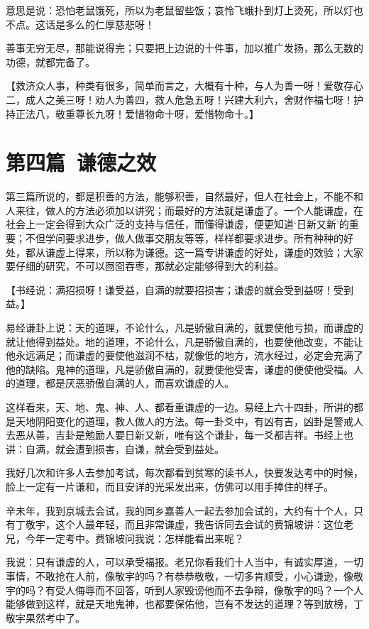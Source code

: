 \documentclass[12pt,twoside,openany]{book}
\newcommand{\kai}[1]{{\CJKfamily{kai}#1}}
\begin{document}
意思是说：恐怕老鼠饿死，所以为老鼠留些饭；哀怜飞蛾扑到灯上烫死，所以灯也不点。这话是多么的仁厚慈悲呀！

善事无穷无尽，那能说得完；只要把上边说的十件事，加以推广发扬，那么无数的功德，就都完备了。

【\kai{救济众人事，种类有很多，简单而言之，大概有十种，与人为善一呀！爱敬存心二，成人之美三呀！劝人为善四，救人危急五呀！兴建大利六，舍财作福七呀！护持正法八，敬重尊长九呀！爱惜物命十呀，爱惜物命十。}】

\chapter{第四篇\ 谦德之效}
第三篇所说的，都是积善的方法，能够积善，自然最好，但人在社会上，不能不和人来往，做人的方法必须加以讲究；而最好的方法就是谦虚了。一个人能谦虚，在社会上一定会得到大众广泛的支持与信任，而懂得谦虚，便更知道‘日新又新’的重要；不但学问要求进步，做人做事交朋友等等，样样都要求进步。所有种种的好处，都从谦虚上得来，所以称为谦德。这一篇专讲谦虚的好处，谦虚的效验；大家要仔细的研究，不可以囫囵吞枣，那就必定能够得到大的利益。

【\kai{书经说：满招损呀！谦受益，自满的就要招损害；谦虚的就会受到益呀！受到益。}】

易经谦卦上说：天的道理，不论什么，凡是骄傲自满的，就要使他亏损，而谦虚的就让他得到益处。地的道理，不论什么，凡是骄傲自满的，也要使他改变，不能让他永远满足；而谦虚的要使他滋润不枯，就像低的地方，流水经过，必定会充满了他的缺陷。鬼神的道理，凡是骄傲自满的，就要使他受害，谦虚的便使他受福。人的道理，都是厌恶骄傲自满的人，而喜欢谦虚的人。

这样看来，天、地、鬼、神、人、都看重谦虚的一边。易经上六十四卦，所讲的都是天地阴阳变化的道理，教人做人的方法。每一卦爻中，有凶有吉，凶卦是警戒人去恶从善，吉卦是勉励人要日新又新，唯有这个谦卦，每一爻都吉祥。书经上也讲：自满，就会遭到损害，自谦，就会受到益处。

我好几次和许多人去参加考试，每次都看到贫寒的读书人，快要发达考中的时候，脸上一定有一片谦和，而且安详的光采发出来，仿佛可以用手捧住的样子。

辛未年，我到京城去会试，我的同乡嘉善人一起去参加会试的，大约有十个人，只有丁敬宇，这个人最年轻，而且非常谦虚，我告诉同去会试的费锦坡讲：这位老兄，今年一定考中。费锦坡问我说：怎样能看出来呢？

我说：只有谦虚的人，可以承受福报。老兄你看我们十人当中，有诚实厚道，一切事情，不敢抢在人前，像敬宇的吗？有恭恭敬敬，一切多肯顺受，小心谦逊，像敬宇的吗？有受人侮辱而不回答，听到人家毁谤他而不去争辩，像敬宇的吗？一个人能够做到这样，就是天地鬼神，也都要保佑他，岂有不发达的道理？等到放榜，丁敬宇果然考中了。
\end{document}
